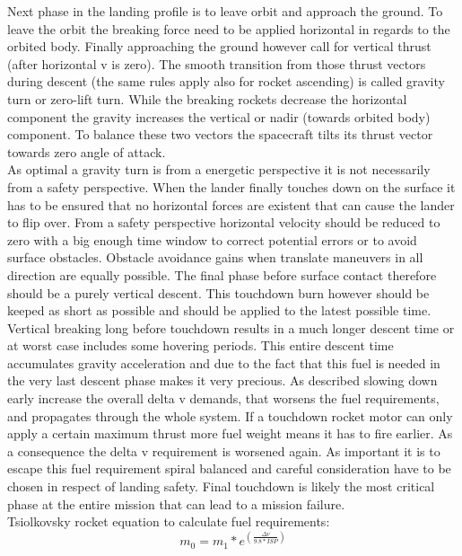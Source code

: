 Next phase in the landing profile is to leave orbit and approach the ground. To leave the orbit the breaking force need to be applied horizontal in regards to the orbited body. Finally approaching the ground however call for vertical thrust (after horizontal v is zero). The smooth transition from those thrust vectors during descent (the same rules apply also for rocket ascending) is called gravity turn or zero-lift turn. While the breaking rockets decrease the horizontal component the gravity increases the vertical or nadir (towards orbited body) component. To balance these two vectors the spacecraft tilts its thrust vector towards zero angle of attack.\\
As optimal a gravity turn is from a energetic perspective it is not necessarily from a safety perspective. When the lander finally touches down on the surface it has to be ensured that no horizontal forces are existent that can cause the lander to flip over. From a safety perspective horizontal velocity should be reduced to zero with a big enough time window to correct potential errors or to avoid surface obstacles. Obstacle avoidance gains when translate maneuvers in all direction are equally possible. The final phase before surface contact therefore should be a purely vertical descent. This touchdown burn however should be keeped as short as possible and should be applied to the latest possible time. Vertical breaking long before touchdown results in a much longer descent time or at worst case includes some hovering periods. This entire descent time accumulates gravity acceleration and due to the fact that this fuel is needed in the very last descent phase makes it very precious. As described slowing down early increase the overall delta v demands, that worsens the fuel requirements, and propagates through the whole system. If a touchdown rocket motor can only apply a certain maximum thrust more fuel weight means it has to fire earlier. As a consequence the delta v requirement is worsened again. As important it is to escape this fuel requirement spiral balanced and careful consideration have to be chosen in respect of landing safety. Final touchdown is likely the most critical phase at the entire mission that can lead to a mission failure.\\
Tsiolkovsky rocket equation to calculate fuel requirements:
$$ m_{0} = m_{1} * e^{\left(\frac{\Delta v} { 9.8 * ISP}\right)} $$